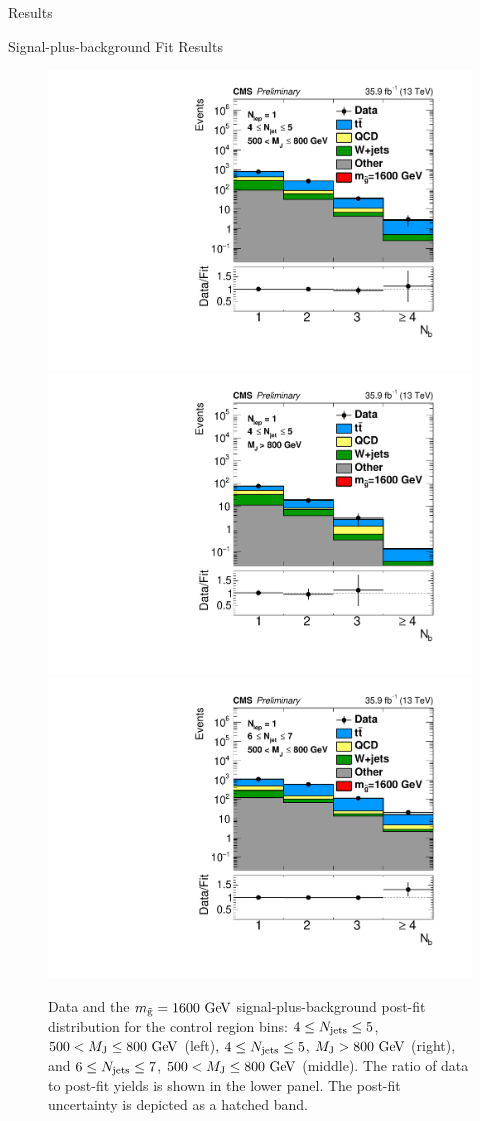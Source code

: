 \begin{section}{Results}
\begin{subsection}{Signal-plus-background Fit Results}
\begin{figure}[tbp!]
\centering
\includegraphics[angle=0,width=0.32\columnwidth]{fig/splusb_nlep1_nj45_lowmj.pdf}
\includegraphics[angle=0,width=0.32\columnwidth]{fig/splusb_nlep1_nj45_highmj.pdf}
\includegraphics[angle=0,width=0.32\columnwidth]{fig/splusb_nlep1_nj67_lowmj.pdf}
\caption{Data and the $m_{\tilde{\mathrm{g}}} = 1600~\mathrm{Ge\kern -0.1em V}$ signal-plus-background post-fit \Nb distribution for the control region bins: $4 \leq N_{\mathrm{jets}} \leq 5$, $500 < M_{\mathrm{J}} \leq 800~\mathrm{Ge\kern -0.1em V}$ (left), $4 \leq N_{\mathrm{jets}} \leq 5$, $M_{\mathrm{J}} > 800~\mathrm{Ge\kern -0.1em V}$ (right), and $6 \leq N_{\mathrm{jets}} \leq 7$, $500 < M_{\mathrm{J}} \leq 800~\mathrm{Ge\kern -0.1em V}$ (middle).
The ratio of data to post-fit yields is shown in the lower panel.
The post-fit uncertainty is depicted as a hatched band.}
\label{fig:splusb_cr}
\end{figure}


\end{subsection}
\end{section}
